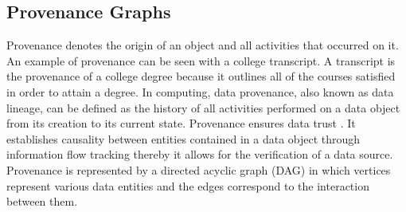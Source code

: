 %
%
%
%
%
%
%
%
%
%
%




\subsection{Provenance Graphs}

Provenance denotes the origin of an object and all activities that occurred on it. An example of provenance can be seen with a college transcript. A transcript is the provenance of a college degree because it outlines all of the courses satisfied in order to attain a degree. In computing, data provenance, also known as data lineage, can be defined
as the history of all activities performed on a data object from its creation to its current state. Provenance ensures data trust \cite{Bertino2015}. It establishes causality between entities contained in a data object through information flow tracking thereby it allows for the verification of a data source. Provenance is represented by a directed acyclic graph (DAG) in which vertices represent various data entities and the edges correspond to the interaction between them. 

